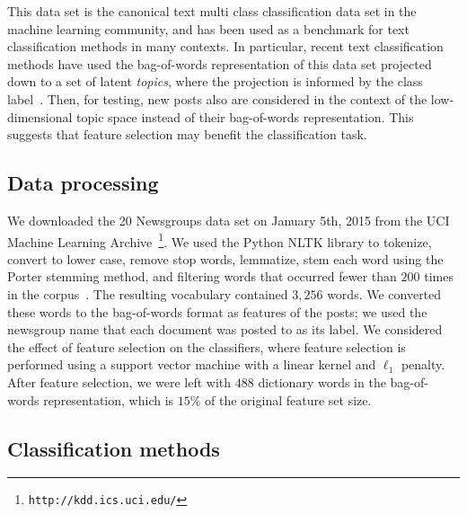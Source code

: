 \documentclass{article} %
\begin{document}
This data set is the canonical text multi class classification data set in the machine learning community, and has been used as a benchmark for text classification methods in many contexts. In particular, recent text classification methods have used the bag-of-words representation of this data set projected down to a set of latent \emph{topics}, where the projection is informed by the class label~\cite{zhu2009,lacoste2009}. Then, for testing, new posts also are considered in the context of the low-dimensional topic space instead of their bag-of-words representation. This suggests that feature selection may benefit the classification task.


\subsection{Data processing}

We downloaded the 20 Newsgroups data set on January 5th, 2015 from the UCI Machine Learning Archive~\footnote{{\tt http://kdd.ics.uci.edu/}}. We used the Python NLTK library to tokenize, convert to lower case, remove stop words, lemmatize, stem each word using the Porter stemming method, and filtering words that occurred fewer than $200$ times in the corpus~\cite{bird2009}. The resulting vocabulary contained $3,256$ words. We converted these words to the bag-of-words format as features of the posts; we used the newsgroup name that each document was posted to as its label. We considered the effect of feature selection on the classifiers, where feature selection is performed using a support vector machine with a linear kernel and $\ell_1$ penalty. After feature selection, we were left with $488$ dictionary words in the bag-of-words representation, which is $15\%$ of the original feature set size.

\subsection{Classification methods}
\end{document}
